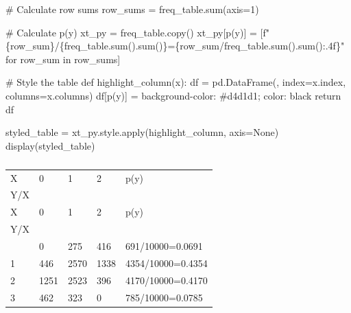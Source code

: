\documentclass[
  letterpaper,
  DIV=11,
  numbers=noendperiod]{scrartcl}
\newenvironment{Shaded}{\begin{snugshade}}{\end{snugshade}}
\newcommand{\BuiltInTok}[1]{\textcolor[rgb]{0.00,0.23,0.31}{#1}}
\newcommand{\CommentTok}[1]{\textcolor[rgb]{0.37,0.37,0.37}{#1}}
\newcommand{\ControlFlowTok}[1]{\textcolor[rgb]{0.00,0.23,0.31}{#1}}
\newcommand{\DecValTok}[1]{\textcolor[rgb]{0.68,0.00,0.00}{#1}}
\newcommand{\KeywordTok}[1]{\textcolor[rgb]{0.00,0.23,0.31}{#1}}
\newcommand{\NormalTok}[1]{\textcolor[rgb]{0.00,0.23,0.31}{#1}}
\newcommand{\OperatorTok}[1]{\textcolor[rgb]{0.37,0.37,0.37}{#1}}
\newcommand{\SpecialCharTok}[1]{\textcolor[rgb]{0.37,0.37,0.37}{#1}}
\newcommand{\SpecialStringTok}[1]{\textcolor[rgb]{0.13,0.47,0.30}{#1}}
\newcommand{\StringTok}[1]{\textcolor[rgb]{0.13,0.47,0.30}{#1}}
\newcommand{\VariableTok}[1]{\textcolor[rgb]{0.07,0.07,0.07}{#1}}
\begin{document}
\begin{Shaded}
\begin{Highlighting}[]
\CommentTok{\# Calculate row sums}
\NormalTok{row\_sums }\OperatorTok{=}\NormalTok{ freq\_table.}\BuiltInTok{sum}\NormalTok{(axis}\OperatorTok{=}\DecValTok{1}\NormalTok{)}

\CommentTok{\# Calculate p(y)}
\NormalTok{xt\_py }\OperatorTok{=}\NormalTok{ freq\_table.copy()}
\NormalTok{xt\_py[}\StringTok{\textquotesingle{}p(y)\textquotesingle{}}\NormalTok{] }\OperatorTok{=}\NormalTok{ [}\SpecialStringTok{f"}\SpecialCharTok{\{}\NormalTok{row\_sum}\SpecialCharTok{\}}\SpecialStringTok{/}\SpecialCharTok{\{}\NormalTok{freq\_table}\SpecialCharTok{.}\BuiltInTok{sum}\NormalTok{()}\SpecialCharTok{.}\BuiltInTok{sum}\NormalTok{()}\SpecialCharTok{\}}\SpecialStringTok{=}\SpecialCharTok{\{}\NormalTok{row\_sum}\OperatorTok{/}\NormalTok{freq\_table}\SpecialCharTok{.}\BuiltInTok{sum}\NormalTok{()}\SpecialCharTok{.}\BuiltInTok{sum}\NormalTok{()}\SpecialCharTok{:.4f\}}\SpecialStringTok{"} \ControlFlowTok{for}\NormalTok{ row\_sum }\KeywordTok{in}\NormalTok{ row\_sums]}

\CommentTok{\# Style the table}
\KeywordTok{def}\NormalTok{ highlight\_column(x):}
\NormalTok{    df }\OperatorTok{=}\NormalTok{ pd.DataFrame(}\StringTok{\textquotesingle{}\textquotesingle{}}\NormalTok{, index}\OperatorTok{=}\NormalTok{x.index, columns}\OperatorTok{=}\NormalTok{x.columns)}
\NormalTok{    df[}\StringTok{\textquotesingle{}p(y)\textquotesingle{}}\NormalTok{] }\OperatorTok{=} \StringTok{\textquotesingle{}background{-}color: \#d4d1d1; color: black\textquotesingle{}}
    \ControlFlowTok{return}\NormalTok{ df}

\NormalTok{styled\_table }\OperatorTok{=}\NormalTok{ xt\_py.style.}\BuiltInTok{apply}\NormalTok{(highlight\_column, axis}\OperatorTok{=}\VariableTok{None}\NormalTok{)}
\NormalTok{display(styled\_table)}
\end{Highlighting}
\end{Shaded}

\begin{longtable}[]{@{}lllll@{}}
\caption{}\label{T_9114f}\tabularnewline
\toprule\noalign{}
X & 0 & 1 & 2 & p(y) \\
Y/X & ~ & ~ & ~ & ~ \\
\midrule\noalign{}
\endfirsthead
\toprule\noalign{}
X & 0 & 1 & 2 & p(y) \\
Y/X & ~ & ~ & ~ & ~ \\
\midrule\noalign{}
\endhead
\bottomrule\noalign{}
\endlastfoot
0 & 0 & 275 & 416 & 691/10000=0.0691 \\
1 & 446 & 2570 & 1338 & 4354/10000=0.4354 \\
2 & 1251 & 2523 & 396 & 4170/10000=0.4170 \\
3 & 462 & 323 & 0 & 785/10000=0.0785 \\
\end{longtable}
\end{document}
